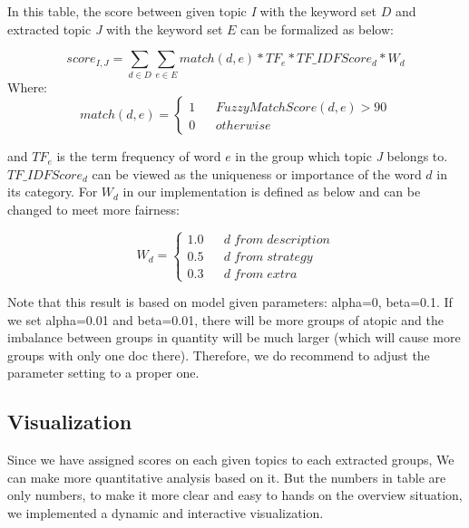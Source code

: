 \documentclass[sigchi]{acmart}
\begin{document}
In this table, the score between given topic \textit{I} with the keyword set $D$ and extracted topic \textit{J} with the keyword set $E$ can be formalized as below:

\begin{equation}
score_{I,J}=\sum_{d\in D}\sum_{e\in E}match(d,e)* TF_{e}* TF\_IDF Score_{d}* W_{d}
\end{equation}
Where:
\begin{equation}
    match(d,e)=\left\{
    \begin{array}{rcl}
1       &      & {Fuzzy Match Score(d,e)      >90      }\\
0     &      & {otherwise}
\end{array} 
    \right.\label{eq:1}
\end{equation}


and $TF_{e}$ is the term frequency of word $e$ in the group which topic \textit{J} belongs to. $TF\_IDF Score_{d}$ can be viewed as the uniqueness or importance of the word $d$ in its category. For $W_{d}$ in our implementation is defined as below and can be changed to meet more fairness:

\begin{equation}
    W_{d}=\left\{
    \begin{array}{rcl}
1.0       &      & {d \;  from \;  description      }\\
0.5     &      & {d \;  from \;   strategy}\\
0.3     &      & {d \;  from \;  extra}
\end{array} 
    \right.\label{eq:2}
\end{equation}

Note that this result is based on model given parameters: alpha=0, beta=0.1. If we set alpha=0.01 and beta=0.01, there will be more groups of atopic and the imbalance between groups in quantity will be much larger (which will cause more groups with only one doc there). Therefore, we do recommend to adjust the parameter setting to a proper one.

\subsection{Visualization}\label{sec:visualization}

Since we have assigned scores on each given topics to each extracted groups, We can make more quantitative analysis based on it. But the numbers in table are only numbers, to make it more clear and easy to hands on the overview situation, we implemented a dynamic and interactive visualization.
\end{document}
